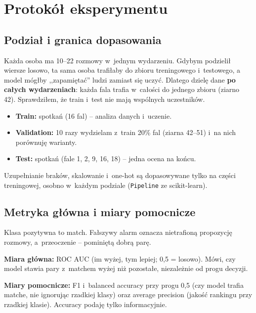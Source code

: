 \documentclass[10pt,twocolumn,a4paper]{article}
\begin{document}
\section{Protokół eksperymentu}
\subsection{Podział i granica dopasowania}
Każda osoba ma 10--22 rozmowy w~jednym wydarzeniu. Gdybym podzielił wiersze losowo,
ta sama osoba trafiłaby do zbioru treningowego i~testowego, a model mógłby ,,zapamiętać''
ludzi zamiast się uczyć. Dlatego dzielę dane \textbf{po całych wydarzeniach}: każda
fala trafia w~całości do jednego zbioru (ziarno 42). Sprawdziłem, że train i~test nie
mają wspólnych uczestników.

\begin{itemize}
\item \textbf{Train:} \NTrain{} spotkań (16 fal) -- analiza danych i~uczenie.
\item \textbf{Validation:} 10 razy wydzielam z~train 20\% fal (ziarna 42--51)
i~na nich porównuję warianty.
\item \textbf{Test:} \NTest{} spotkań (fale 1, 2, 9, 16, 18) -- jedna ocena na końcu.
\end{itemize}

Uzupełnianie braków, skalowanie i~one-hot są dopasowywane tylko na części treningowej,
osobno w~każdym podziale (\texttt{Pipeline} ze scikit-learn).

\subsection{Metryka główna i miary pomocnicze}
Klasa pozytywna to match. Fałszywy alarm oznacza nietrafioną propozycję rozmowy,
a~przeoczenie -- pominiętą dobrą parę.

\noindent\textbf{Miara główna:} ROC AUC (im wyżej, tym lepiej; 0,5 = losowo). Mówi, czy model
stawia pary z~matchem wyżej niż pozostałe, niezależnie od progu decyzji.

\noindent\textbf{Miary pomocnicze:} F1 i~balanced accuracy przy progu 0,5 (czy model trafia
matche, nie ignorując rzadkiej klasy) oraz average precision (jakość rankingu przy
rzadkiej klasie). Accuracy podaję tylko informacyjnie.
\end{document}
